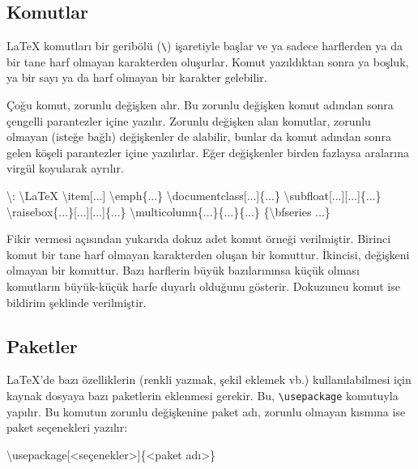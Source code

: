 \documentclass[
  10pt,
]{scrbook}
\newenvironment{Shaded}{\begin{snugshade}}{\end{snugshade}}
\newcommand{\NormalTok}[1]{#1}
\begin{document}
\hypertarget{komutlar}{%
\subsection{Komutlar}\label{komutlar}}

LaTeX komutları bir geribölü (\texttt{\textbackslash{}}) işaretiyle başlar ve ya sadece
harflerden ya da bir tane harf olmayan karakterden oluşurlar. Komut
yazıldıktan sonra ya boşluk, ya bir sayı ya da harf olmayan bir karakter
gelebilir.

Çoğu komut, zorunlu değişken alır. Bu zorunlu değişken komut adından
sonra çengelli parantezler içine yazılır. Zorunlu değişken alan
komutlar, zorunlu olmayan (isteğe bağlı) değişkenler de alabilir, bunlar
da komut adından sonra gelen köşeli parantezler içine yazılırlar. Eğer
değişkenler birden fazlaysa aralarına virgül koyularak ayrılır.

\begin{Shaded}
\begin{Highlighting}[]
\NormalTok{\textbackslash{}:}
\NormalTok{\textbackslash{}LaTeX}
\NormalTok{\textbackslash{}item[...]}
\NormalTok{\textbackslash{}emph\{...\}}
\NormalTok{\textbackslash{}documentclass[...]\{...\}}
\NormalTok{\textbackslash{}subfloat[...][...]\{...\}}
\NormalTok{\textbackslash{}raisebox\{...\}[...][...]\{...\}}
\NormalTok{\textbackslash{}multicolumn\{...\}\{...\}\{...\}}
\NormalTok{\{\textbackslash{}bfseries ...\}}
\end{Highlighting}
\end{Shaded}

Fikir vermesi açısından yukarıda dokuz adet komut örneği verilmiştir.
Birinci komut bir tane harf olmayan karakterden oluşan bir komuttur.
İkincisi, değişkeni olmayan bir komuttur. Bazı harflerin büyük
bazılarınınsa küçük olması komutların büyük-küçük harfe duyarlı olduğunu
gösterir. Dokuzuncu komut ise bildirim şeklinde verilmiştir.

\hypertarget{paketler}{%
\subsection{Paketler}\label{paketler}}

LaTeX'de bazı özelliklerin (renkli yazmak, şekil eklemek vb.)
kullanılabilmesi için kaynak dosyaya bazı paketlerin eklenmesi gerekir.
Bu, \texttt{\textbackslash{}usepackage} komutuyla yapılır. Bu komutun zorunlu değişkenine
paket adı, zorunlu olmayan kısmına ise paket seçenekleri yazılır:

\begin{Shaded}
\begin{Highlighting}[]
\NormalTok{\textbackslash{}usepackage[\textless{}seçenekler\textgreater{}]\{\textless{}paket adı\textgreater{}\}}
\end{Highlighting}
\end{Shaded}
\end{document}
